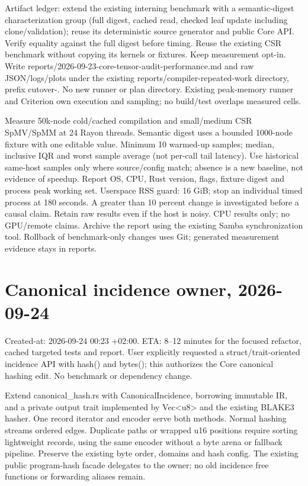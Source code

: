 \documentclass[11pt,a4paper]{article}
\begin{document}
Artifact ledger: extend the existing interning benchmark with a semantic-digest
characterization group (full digest, cached read, checked leaf update including
clone/validation); reuse its deterministic source generator and public Core API.
Verify equality against the full digest before timing. Reuse the existing CSR
benchmark without copying its kernels or fixtures. Keep measurement opt-in.
Write reports/2026-09-23-core-tensor-audit-performance.md and raw JSON/logs/plots
under the existing reports/compiler-repeated-work directory, prefix cutover-.
No new runner or plan directory. Existing peak-memory runner and Criterion own
execution and sampling; no build/test overlaps measured cells.

Measure 50k-node cold/cached compilation and small/medium CSR SpMV/SpMM at
24 Rayon threads. Semantic digest uses a bounded 1000-node fixture with one
editable value. Minimum 10 warmed-up samples; median, inclusive IQR and worst
sample average (not per-call tail latency). Use historical same-host samples
only where source/config match; absence is a new baseline, not evidence of speedup.
Report OS, CPU, Rust version, flags, fixture digest and process peak working set.
Userspace RSS guard: 16 GiB; stop an individual timed process at 180 seconds.
A greater than 10 percent change is investigated before a causal claim. Retain
raw results even if the host is noisy. CPU results only; no GPU/remote claims.
Archive the report using the existing Samba synchronization tool. Rollback of
benchmark-only changes uses Git; generated measurement evidence stays in reports.

\section*{Canonical incidence owner, 2026-09-24}
Created-at: 2026-09-24 00:23 +02:00. ETA: 8--12 minutes for the focused
refactor, cached targeted tests and report. User explicitly requested a
struct/trait-oriented incidence API with hash() and bytes(); this authorizes
the Core canonical hashing edit. No benchmark or dependency change.

Extend canonical\_hash.rs with CanonicalIncidence, borrowing immutable IR,
and a private output trait implemented by Vec<u8> and the existing BLAKE3
hasher. One record iterator and encoder serve both methods. Normal hashing
streams ordered edges. Duplicate paths or wrapped u16 positions require
sorting lightweight records, using the same encoder without a byte arena or
fallback pipeline. Preserve the existing byte order, domains and hash config.
The existing public program-hash facade delegates to the owner; no old
incidence free functions or forwarding aliases remain.
\end{document}
